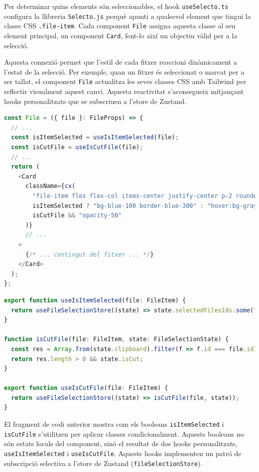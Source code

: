 Per determinar quins elements són seleccionables, el hook \texttt{useSelecto.ts} configura la llibreria \texttt{Selecto.js} perquè apunti a qualsevol element que tingui la classe CSS \texttt{.file-item}. Cada component \texttt{File} assigna aquesta classe al seu element principal, un component \texttt{Card}, fent-lo així un objectiu vàlid per a la selecció.

Aquesta connexió permet que l'estil de cada fitxer reaccioni dinàmicament a l'estat de la selecció. Per exemple, quan un fitxer és seleccionat o marcat per a ser tallat, el component \texttt{File} actualitza les seves classes CSS amb Tailwind per reflectir visualment aquest canvi. Aquesta reactivitat s'aconsegueix mitjançant hooks personalitzats que se subscriuen a l'store de Zustand.

\begin{lstlisting}[language=typescript, caption={Estils dinàmics del component `File` a `index.tsx`}]
const File = ({ file }: FileProps) => {
  // ...
  const isItemSelected = useIsItemSelected(file);
  const isCutFile = useIsCutFile(file);
  // ...
  return (
    <Card
      className={cx(
        "file-item flex flex-col items-center justify-center p-2 rounded-lg cursor-pointer",
        isItemSelected ? "bg-blue-100 border-blue-300" : "hover:bg-gray-100",
        isCutFile && "opacity-50"
      )}
      // ...
    >
      {/* ... contingut del fitxer ... */}
    </Card>
  );
};
\end{lstlisting}

\begin{lstlisting}[language=typescript, caption={Implementació dels hooks `useIsItemSelected` i `useIsCutFile` a `fileSelectionStore.ts`}]
export function useIsItemSelected(file: FileItem) {
  return useFileSelectionStore((state) => state.selectedFilesIds.some(f => f === file.id));
}

function isCutFile(file: FileItem, state: FileSelectionState) {
  const res = Array.from(state.clipboard).filter(f => f.id === file.id);
  return res.length > 0 && state.isCut;
}

export function useIsCutFile(file: FileItem) {
  return useFileSelectionStore((state) => isCutFile(file, state));
}
\end{lstlisting}

El fragment de codi anterior mostra com els booleans \texttt{isItemSelected} i \texttt{isCutFile} s'utilitzen per aplicar classes condicionalment. Aquests booleans no són estats locals del component, sinó el resultat de dos hooks personalitzats, \texttt{useIsItemSelected} i \texttt{useIsCutFile}. Aquests hooks implementen un patró de subscripció selectiva a l'store de Zustand (\texttt{fileSelectionStore}).

